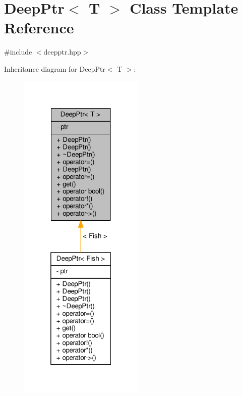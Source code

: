 \hypertarget{classDeepPtr}{}\section{Deep\+Ptr$<$ T $>$ Class Template Reference}
\label{classDeepPtr}


{\ttfamily \#include $<$deepptr.\+hpp$>$}



Inheritance diagram for Deep\+Ptr$<$ T $>$\+:\nopagebreak
\begin{figure}[H]
\begin{center}
\leavevmode
\includegraphics[width=169pt]{classDeepPtr__inherit__graph}
\end{center}
\end{figure}


